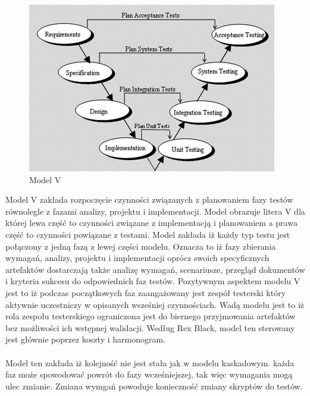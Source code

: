 \begin{figure}[h]
\centerline{\includegraphics[scale=0.5]{img/vmodel.png}}
\caption{Model V}
\label{fig:vmodel}
\end{figure}
Model V zakłada rozpoczęcie czynności związanych z planowaniem fazy testów równolegle z fazami analizy, projektu i implementacji. Model obrazuje litera V dla której lewa część to czynności związane z implementacją i planowaniem a prawa część to czynności powiązane z testami. Model zakłada iż każdy typ testu jest połączony z jedną fazą z lewej części modelu. Oznacza to iż fazy zbierania wymagań, analizy, projektu i implementacji oprócz swoich specyficznych artefaktów dostarczają także analizę wymagań, scenariusze, przegląd dokumentów i kryteria sukcesu do odpowiednich faz testów.
Pozytywnym aspektem modelu V jest to iż podczas początkowych faz zaangażowany jest zespół testerski który aktywnie uczestniczy w opisanych wsześniej czynnościach. Wadą modelu jest to iż rola zespołu testerskiego ograniczona jest do biernego przyjmowania artefaktów bez możliwości ich wstępnej walidacji.  Według Rex Black, model ten sterowany jest głównie poprzez koszty i harmonogram.
\paragraph{}
Model ten zakłada iż kolejność nie jest stała jak w modelu kaskadowym. każda  faz może spowodować powrót do fazy wcześniejszej, tak więc wymagania mogą ulec zmianie. Zmiana wymgań powoduje konieczność zmiany skryptów do testów.

